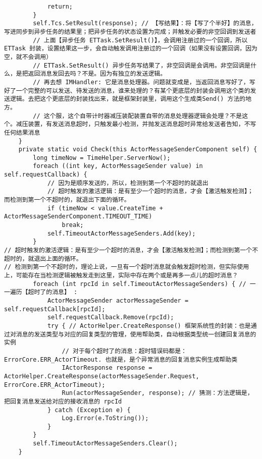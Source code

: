 \documentclass[9pt, b5paper]{article}
\begin{document}
\begin{verbatim}
            return;
        }
        self.Tcs.SetResult(response); // 【写结果】：将【写了个半好】的消息，写进同步到异步任务的结果里；把异步任务的状态设置为完成；并触发必要的非空回调到发送者
        // 上面【异步任务 ETTask.SetResult()】，会调用注册过的一个回调，所以ETTask 封装，设置结果这一步，会自动触发调用注册过的一个回调（如果没有设置回调，因为空，就不会调用）
        // ETTask.SetResult() 异步任务写结果了，非空回调是会调用。非空回调是什么，是把返回消息发回去吗？不是。因为有独立的发送逻辑。
        // 再去想 IMHandler: 它是消息处理器。问题就变成是，当返回消息写好了，写好了一个完整的可以发送、待发送的消息，谁来处理的？有某个更底层的封装会调用这个类的发送逻辑。去把这个更底层的封装找出来，就是框架封装里，调用这个生成类Send() 方法的地方。
        // 这个服，这个自带计时器减压装配装置自带的消息处理器逻辑会处理？不是这个。减压装置，有发送消息超时，只触发最小检测，并抛发送消息超时异常给发送者告知，不写任何结果消息 
    }
    private static void Check(this ActorMessageSenderComponent self) {
        long timeNow = TimeHelper.ServerNow();
        foreach ((int key, ActorMessageSender value) in self.requestCallback) {
            // 因为是顺序发送的，所以，检测到第一个不超时的就退出
            // 超时触发的激活逻辑：是有至少一个超时的消息，才会【激活触发检测】；而检测到第一个不超时的，就退出下面的循环。
            if (timeNow < value.CreateTime + ActorMessageSenderComponent.TIMEOUT_TIME) 
                break;
            self.TimeoutActorMessageSenders.Add(key);
        }
// 超时触发的激活逻辑：是有至少一个超时的消息，才会【激活触发检测】；而检测到第一个不超时的，就退出上面的循环。
// 检测到第一个不超时的，理论上说，一旦有一个超时消息就会触发超时检测，但实际使用上，可能存在当检测逻辑被触发走到这里，实际中存在两个或是再多一点儿的超时消息？
        foreach (int rpcId in self.TimeoutActorMessageSenders) { // 一一遍历【超时了的消息】 :
            ActorMessageSender actorMessageSender = self.requestCallback[rpcId];
            self.requestCallback.Remove(rpcId);
            try { // ActorHelper.CreateResponse() 框架系统性的封装：也是通过对消息的发送类型与对应的回复类型的管理，使用帮助类，自动根据类型统一创建回复消息的实例
                // 对于每个超时了的消息：超时错误码都是：ErrorCore.ERR_ActorTimeout. 也就是，是个异常消息的回复消息实例生成帮助类
                IActorResponse response = ActorHelper.CreateResponse(actorMessageSender.Request, ErrorCore.ERR_ActorTimeout);
                Run(actorMessageSender, response); // 猜测：方法逻辑是，把回复消息发送给对应的接收消息的 rpcId
            } catch (Exception e) {
                Log.Error(e.ToString());
            }
        }
        self.TimeoutActorMessageSenders.Clear();
    }


\end{verbatim}
\end{document}
